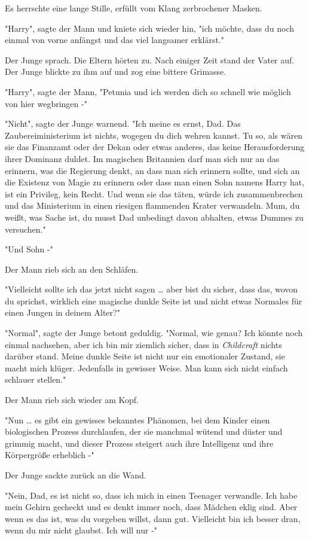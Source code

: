 {Es herrschte eine lange Stille, erfüllt vom Klang zerbrochener Masken.

"Harry", sagte der Mann und kniete sich wieder hin, "ich möchte, dass du noch einmal von vorne anfängst und das viel langsamer erklärst."

Der Junge sprach. Die Eltern hörten zu. Nach einiger Zeit stand der Vater auf. Der Junge blickte zu ihm auf und zog eine bittere Grimasse.

"Harry", sagte der Mann, "Petunia und ich werden dich so schnell wie möglich von hier wegbringen -"

"Nicht", sagte der Junge warnend. "Ich meine es ernst, Dad. Das Zaubereiministerium ist nichts, wogegen du dich wehren kannst. Tu so, als wären sie das Finanzamt oder der Dekan oder etwas anderes, das keine Herausforderung ihrer Dominanz duldet. Im magischen Britannien darf man sich nur an das erinnern, was die Regierung denkt, an dass man sich erinnern sollte, und sich an die Existenz von Magie zu erinnern oder dass man einen Sohn namens Harry hat, ist ein Privileg, kein Recht. Und wenn sie das täten, würde ich zusammenbrechen und das Ministerium in einen riesigen flammenden Krater verwandeln. Mum, du weißt, was Sache ist, du musst Dad unbedingt davon abhalten, etwas Dummes zu versuchen."

"Und Sohn -"

Der Mann rieb sich an den Schläfen.

"Vielleicht sollte ich das jetzt nicht sagen … aber bist du sicher, dass das, wovon du sprichst, wirklich eine magische dunkle Seite ist und nicht etwas Normales für einen Jungen in deinem Alter?"

"Normal", sagte der Junge betont geduldig. "Normal, wie genau? Ich könnte noch einmal nachsehen, aber ich bin mir ziemlich sicher, dass in \emph{Childcraft} nichts darüber stand. Meine dunkle Seite ist nicht nur ein emotionaler Zustand, sie macht mich klüger. Jedenfalls in gewisser Weise. Man kann sich nicht einfach schlauer stellen."

Der Mann rieb sich wieder am Kopf.

"Nun … es gibt ein gewisses bekanntes Phänomen, bei dem Kinder einen biologischen Prozess durchlaufen, der sie manchmal wütend und düster und grimmig macht, und dieser Prozess steigert auch ihre Intelligenz und ihre Körpergröße erheblich -"

Der Junge sackte zurück an die Wand.

"Nein, Dad, es ist nicht so, dass ich mich in einen Teenager verwandle. Ich habe mein Gehirn gecheckt und es denkt immer noch, dass Mädchen eklig sind. Aber wenn es das ist, was du vorgeben willst, dann gut. Vielleicht bin ich besser dran, wenn du mir nicht glaubst. Ich will nur -"

}
